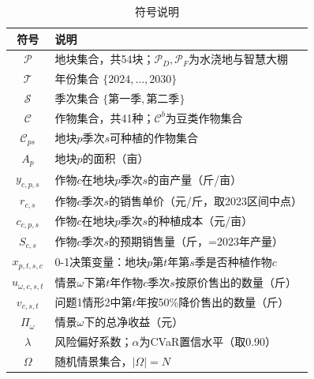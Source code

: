 \begin{table}[htbp]
	\caption{符号说明}
	\label{tab:symbols}
	\centering
	\begin{tabular}{cl}
		\toprule
		符号 & 说明 \\
		\midrule
		$\mathcal{P}$ & 地块集合，共54块；$\mathcal{P}_D,\mathcal{P}_F$为水浇地与智慧大棚 \\
		$\mathcal{T}$ & 年份集合 $\{2024,\dots,2030\}$ \\
		$\mathcal{S}$ & 季次集合 $\{\text{第一季},\text{第二季}\}$ \\
		$\mathcal{C}$ & 作物集合，共41种；$\mathcal{C}^b$为豆类作物集合 \\
		$\mathcal{C}_{ps}$ & 地块$p$季次$s$可种植的作物集合 \\
		$A_p$ & 地块$p$的面积（亩） \\
		$y_{c,p,s}$ & 作物$c$在地块$p$季次$s$的亩产量（斤/亩） \\
		$r_{c,s}$ & 作物$c$季次$s$的销售单价（元/斤，取2023区间中点） \\
		$c_{c,p,s}$ & 作物$c$在地块$p$季次$s$的种植成本（元/亩） \\
		$S_{c,s}$ & 作物$c$季次$s$的预期销售量（斤，=2023年产量） \\
		$x_{p,t,s,c}$ & 0-1决策变量：地块$p$第$t$年第$s$季是否种植作物$c$ \\
		$u_{\omega,c,s,t}$ & 情景$\omega$下第$t$年作物$c$季次$s$按原价售出的数量（斤） \\
		$v_{c,s,t}$ & 问题1情形2中第$t$年按50\%降价售出的数量（斤） \\
		$\Pi_\omega$ & 情景$\omega$下的总净收益（元） \\
		$\lambda$ & 风险偏好系数；$\alpha$为CVaR置信水平（取0.90） \\
		$\Omega$ & 随机情景集合，$|\Omega|=N$ \\
		\bottomrule
	\end{tabular}
\end{table}
